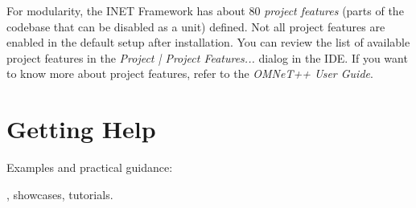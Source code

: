For modularity, the INET Framework has about 80 \textit{project features}
(parts of the codebase that can be disabled as a unit) defined. Not all project
features are enabled in the default setup after installation. You can review
the list of available project features in the \emph{Project | Project Features...}
dialog in the IDE. If you want to know more about project features, refer to the
\emph{OMNeT++ User Guide}.

\section{Getting Help}
\label{sec:usage:getting-help}

Examples and practical guidance:

 ,
 showcases,
 tutorials.






